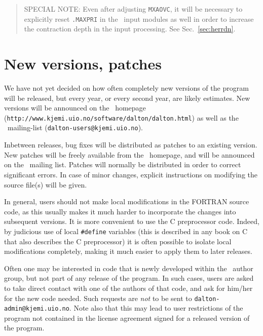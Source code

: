 \begin{quote}
SPECIAL NOTE: Even after adjusting \verb|MXAOVC|, it will be
necessary to explicitly reset \verb|.MAXPRI| in the
\her\ input modules as well in order to increase the contraction depth
in the input processing.  See Sec.~\ref{sec:herrdn}.
\end{quote}

\section{New versions, patches}

We have not yet decided on how often completely new versions of the
program will be released, but every year, or every second year, are
likely estimates. New versions will be announced on the \siraba\
homepage (\verb|http://www.kjemi.uio.no/software/dalton/dalton.html|) as well
as the \siraba\ mailing-list
(\verb|dalton-users@kjemi.uio.no|).

Inbetween releases, bug fixes will be distributed as
patches to an 
existing version. New patches will be freely available from the
\siraba\ homepage, and will be announced on the \siraba\ mailing
list. Patches will normally be distributed in order to correct
significant errors. In case of minor changes, explicit
instructions on modifying the source file(s) will be given.

In general, users should not make local
modifications in the FORTRAN source code, as this usually makes it
much harder to incorporate the changes into subsequent versions.
It is more convenient to use the C preprocessor code.  Indeed, by
judicious use of local \verb|#define|\index{define} variables (this
is described in any book on C that also describes the C
preprocessor) it is often possible to isolate local 
modifications completely, making it much easier
to apply them to later 
releases. 

Often one may be interested in code that is newly developed\index{new
code} within the 
\siraba\ author group, but not part of any release of the program. In
such cases, users are asked to take direct contact with one of the
authors of that code, and ask for him/her for the new code
needed. Such requests are {\em not} to be sent to
\verb|dalton-admin@kjemi.uio.no|. Note also that this may lead to user
restrictions of the program not contained in the license agreement
signed for a released version of the program.

